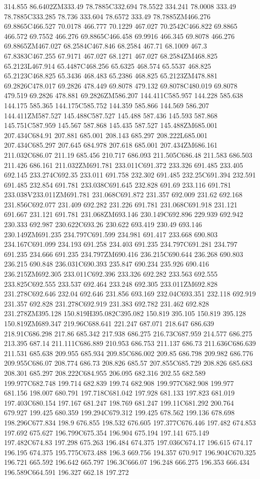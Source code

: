 314.855 86.6402ZM333.49 78.7885C332.694 78.5522 334.241 78.0008 333.49 78.7885C333.285 78.736 333.604 78.6572 333.49 78.7885ZM466.276 69.8865C466.527 70.0178 466.777 70.1229 467.027 70.2542C466.822 69.8865 466.572 69.7552 466.276 69.8865C466.458 69.9916 466.345 69.8078 466.276 69.8865ZM467.027 68.2584C467.846 68.2584 467.71 68.1009 467.3 67.8383C467.255 67.9171 467.027 68.1271 467.027 68.2584ZM468.825 65.2123L467.914 65.4487C468.256 65.6325 468.574 65.5537 468.825 65.2123C468.825 65.3436 468.483 65.2386 468.825 65.2123ZM478.881 69.2826C478.017 69.2826 478.449 69.8078 479.132 69.8078C480.019 69.8078 479.519 69.2826 478.881 69.2826ZM586.207 144.411C585.957 144.228 585.638 144.175 585.365 144.175C585.752 144.359 585.866 144.569 586.207 144.411ZM587.527 145.488C587.527 145.488 587.436 145.593 587.868 145.751C587.959 145.567 587.868 145.435 587.527 145.488ZM685.001 207.434C684.91 207.881 685.001 208.143 685.297 208.222L685.001 207.434C685.297 207.645 684.978 207.618 685.001 207.434ZM686.161 211.032C686.07 211.19 685.456 210.717 686.093 211.505C686.48 211.583 686.503 211.426 686.161 211.032ZM691.781 233.011C691.372 233.326 691.485 233.405 692.145 233.274C692.35 233.011 691.758 232.302 691.485 232.25C691.394 232.591 691.485 232.854 691.781 233.038C691.645 232.828 691.69 233.116 691.781 233.038V233.011ZM691.781 231.068C691.872 231.357 692.009 231.62 692.168 231.856C692.077 231.409 692.282 231.226 691.781 231.068C691.918 231.121 691.667 231.121 691.781 231.068ZM693.146 230.149C692.896 229.939 692.942 230.333 692.987 230.622C693.26 230.622 693.419 230.49 693.146 230.149ZM691.235 234.797C691.599 234.981 691.417 233.668 690.803 234.167C691.099 234.193 691.258 234.403 691.235 234.797C691.281 234.797 691.235 234.666 691.235 234.797ZM690.416 236.215C690.644 236.268 690.803 236.215 690.848 236.031C690.393 235.847 690.234 235.926 690.416 236.215ZM692.305 233.011C692.396 233.326 692.282 233.563 692.555 233.825C692.555 233.537 692.464 233.248 692.305 233.011ZM692.828 231.278C692.646 232.04 692.646 231.856 693.169 232.04C693.351 232.118 692.919 231.357 692.828 231.278C692.919 231.383 692.782 231.462 692.828 231.278ZM395.128 150.819H395.082C395.082 150.819 395.105 150.819 395.128 150.819ZM689.347 219.96C688.641 221.247 687.071 218.647 686.639 218.91C686.298 217.86 685.342 217.938 686.275 216.73C687.959 214.577 686.275 213.395 687.14 211.111C686.889 210.953 686.753 211.137 686.73 211.636C686.639 211.531 685.638 209.955 685.934 209.85C686.002 209.85 686.798 209.982 686.776 209.955C686.07 208.774 686.73 208.826 685.57 207.855C685.729 208.826 685.683 208.301 685.297 208.222C684.955 206.095 682.316 202.55 682.589 199.977C682.748 199.714 682.839 199.74 682.908 199.977C682.908 199.977 681.156 198.007 680.791 197.718C681.042 197.928 681.133 197.823 681.019 197.403C680.154 197.167 681.247 198.769 681.247 199.11C681.292 200.764 679.927 199.425 680.359 199.294C679.312 199.425 678.562 199.136 678.698 198.296C677.834 198.9 676.855 198.532 676.605 197.377C676.446 197.482 674.853 197.692 675.627 196.799C675.354 196.904 675.194 197.141 675.149 197.482C674.83 197.298 675.263 196.484 674.375 197.036C674.17 196.615 674.17 196.195 674.375 195.775C673.488 196.3 669.756 194.357 670.917 196.904C670.325 196.721 665.592 196.642 665.797 196.3C666.07 196.248 666.275 196.353 666.434 196.589C664.591 196.327 662.18 197.272 